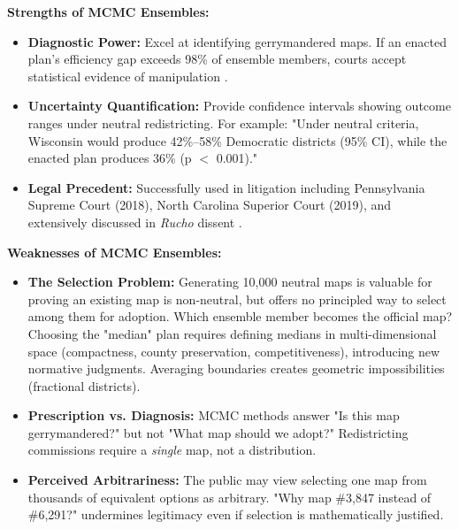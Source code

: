 \textbf{Strengths of MCMC Ensembles:}
\begin{itemize}
\item \textbf{Diagnostic Power:} Excel at identifying gerrymandered maps. If an enacted plan's efficiency gap exceeds 98\% of ensemble members, courts accept statistical evidence of manipulation \cite{chen2013unintentional}.
\item \textbf{Uncertainty Quantification:} Provide confidence intervals showing outcome ranges under neutral redistricting. For example: "Under neutral criteria, Wisconsin would produce 42\%--58\% Democratic districts (95\% CI), while the enacted plan produces 36\% (p $<$ 0.001)."
\item \textbf{Legal Precedent:} Successfully used in litigation including Pennsylvania Supreme Court (2018), North Carolina Superior Court (2019), and extensively discussed in \textit{Rucho} dissent \cite{rucho2019}.
\end{itemize}

\textbf{Weaknesses of MCMC Ensembles:}
\begin{itemize}
\item \textbf{The Selection Problem:} Generating 10,000 neutral maps is valuable for proving an existing map is non-neutral, but offers no principled way to select among them for adoption. Which ensemble member becomes the official map? Choosing the "median" plan requires defining medians in multi-dimensional space (compactness, county preservation, competitiveness), introducing new normative judgments. Averaging boundaries creates geometric impossibilities (fractional districts).
\item \textbf{Prescription vs. Diagnosis:} MCMC methods answer "Is this map gerrymandered?" but not "What map should we adopt?" Redistricting commissions require a \textit{single} map, not a distribution.
\item \textbf{Perceived Arbitrariness:} The public may view selecting one map from thousands of equivalent options as arbitrary. "Why map \#3,847 instead of \#6,291?" undermines legitimacy even if selection is mathematically justified.
\end{itemize}

